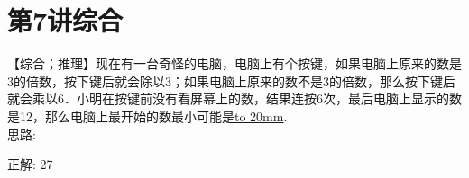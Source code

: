 \section{第7讲\quad 综合}

\item {
    【综合；推理】现在有一台奇怪的电脑，电脑上有个按键，如果电脑上原来的数是3的倍数，按下键后就会除以3；如果电脑上原来的数不是3的倍数，那么按下键后就会乘以6．小明在按键前没有看屏幕上的数，结果连按6次，最后电脑上显示的数是12，那么电脑上最开始的数最小可能是\underline{\hbox to 20mm{}}.
    \ifshowSolution
        \fangsong{}
        \\
        思路:

        正解: 27
    \else
        \\ \\ \\
    \fi
}

